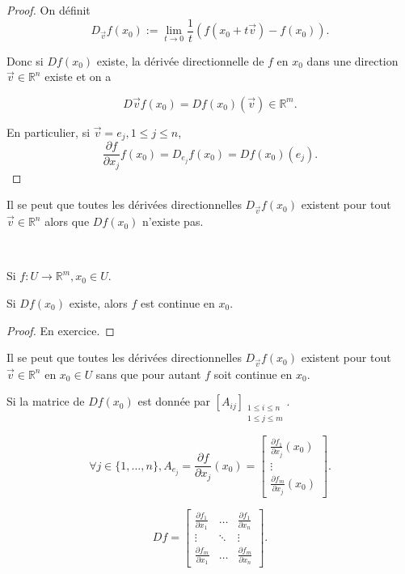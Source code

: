\documentclass[french]{article}
\begin{document}
\begin{proof}
  On définit
  \begin{equation*}
    D _{\overrightarrow{ v } }f(x_0) := \lim_{t \to 0} \frac{1}{t}(f(x_0+t \overrightarrow{ v } )-f(x_0)).
  \end{equation*}

  Donc si $Df(x_0)$ existe, la dérivée directionnelle de $f$ en $x_0$ dans une direction $\overrightarrow{ v } \in \mathbb{R}^n$ existe et on a

  $$ D \overrightarrow{ v } f(x_0) = Df(x_0)(\overrightarrow{ v } ) \in \mathbb{R}^m.$$

  En particulier, si $\overrightarrow{ v } = e_j, 1 \leq j \leq n $,
  \begin{equation*}
    \frac{\partial f }{\partial x_j }f(x_0) = D _{e _{j}} f(x_0) = Df(x_0)(e_j).
  \end{equation*}
\end{proof}

Il se peut que toutes les dérivées directionnelles $D _{\overrightarrow{ v } }f(x_0)$ existent pour tout $\overrightarrow{ v } \in \mathbb{R}^n $ alors que $Df(x_0)$ n'existe pas.

\

\begin{thm}
  Si $f : U \to \mathbb{R}^m, x_0 \in U$.

  Si $Df(x_0)$ existe, alors $f$ est continue en $x_0$.
\end{thm}

\begin{proof}
  En exercice.
\end{proof}

Il se peut que toutes les dérivées directionnelles $D _{\overrightarrow{ v } } f(x_0)$ existent pour tout $\overrightarrow{ v } \in \mathbb{R}^n$ en $x_0 \in U$ sans que pour autant $f$ soit continue en $x_0$.

Si la matrice de $Df(x_0)$ est donnée par $[A _{ij}] _{\substack{1 \leq i \leq n \\ 1 \leq j \leq m}}$.

$$ \forall j \in \{ 1, \dots, n \}, A _{e_j} = \frac{\partial f }{\partial x_j}(x_0) = \left[ \begin{matrix}
  \frac{\partial f_1 }{\partial x_j}(x_0) \\
  \vdots \\
  \frac{\partial f_m }{\partial x_j}(x_0)
\end{matrix} \right].$$

$$ Df = \left[ \begin{matrix}
  \frac{\partial f_1 }{\partial x_1 } & \dots & \frac{\partial f_1 }{\partial x_n }  \\
  \vdots & \ddots & \vdots \\
  \frac{\partial f_m }{\partial x_1 } & \dots & \frac{\partial f_m}{\partial x_n }
\end{matrix} \right].$$
\end{document}
